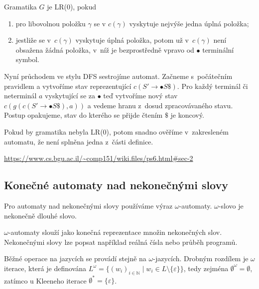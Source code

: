 \begin{definition}
    Gramatika $G$ je LR(0), pokud
    \begin{enumerate}
        \item pro libovolnou položku $\gamma$ se v $c(\gamma)$ vyskytuje
            nejvýše jedna úplná položka;
        \item jestliže se v~$c(\gamma)$ vyskytuje úplná položka, potom
            už v~$c(\gamma)$ není obsažena žádná položka, v~níž
            je bezprostředně vpravo od $\bullet$ terminální symbol.
    \end{enumerate}
\end{definition}

Nyní průchodem ve stylu DFS sestrojíme automat. Začneme s~počátečním
pravidlem a vytvoříme stav reprezentující $c(S' \to \bullet S\$)$.
Pro každý terminál či neterminál $a$ vyskytující se
za $\bullet$ teď vytvoříme nový stav $c(g(c(S' \to \bullet S\$), a))$
a vedeme hranu z~dosud zpracovávaného stavu.
Postup opakujeme, stav do kterého se přijde čtením $\$$ je koncový.

Pokud by gramatika nebyla LR(0), potom snadno ověříme v~zakresleném
automatu, že není splněna jedna z~části definice.

\begin{example}
    \href{https://www.cs.bgu.ac.il/~comp151/wiki.files/ps6.html\#sec-2}
{https://www.cs.bgu.ac.il/{\textasciitilde}comp151/wiki.files/ps6.html\#sec-2}
\end{example}


\subsection{Konečné automaty nad nekonečnými slovy}


Pro automaty nad nekonečnými slovy používáme výraz $\omega$-automaty.
$\omega$-slovo je nekonečně dlouhé slovo.

$\omega$-automaty slouží jako konečná reprezentace množin nekonečných
slov. Nekonečnými slovy lze popsat například reálná čísla nebo průběh
programů.

Běžné operace na jazycích se provádí stejně na $\omega$-jazycích.
Drobným rozdílem je $\omega$ iterace, která je definována
$L^\omega = \{ (w_i)_{i \in \mathbb{N}} \mid w_i \in L \setminus \{ \varepsilon \} \}$,
tedy zejména
$\emptyset^\omega = \emptyset$, zatímco u Kleeneho iterace
$\emptyset^* = \{ \varepsilon \}$.

